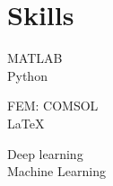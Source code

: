 \documentclass{my_cv}%
\begin{document}
\section{Skills}
\vspace{1em}
\begin{minipage}{0.35\textwidth}
    MATLAB \\           
  Python \\
   
\end{minipage}
\begin{minipage}{0.35\textwidth}
   FEM: COMSOL \\
   \LaTeX \\

\end{minipage}
\begin{minipage}{0.35\textwidth}
   Deep learning \\
   Machine Learning \\

\end{minipage}

\end{document}
